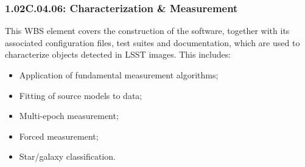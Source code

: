 \subsubsection*{1.02C.04.06: Characterization \& Measurement}

This WBS element covers the construction of the software, together with
its associated configuration files, test suites and documentation, which
are used to characterize objects detected in LSST images. This includes:

\begin{itemize}
\item{Application of fundamental measurement algorithms;}
\item{Fitting of source models to data;}
\item{Multi-epoch measurement;}
\item{Forced measurement;}
\item{Star/galaxy classification.}
\end{itemize}
